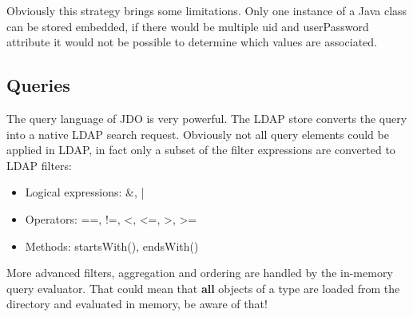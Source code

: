 \documentclass[a4paper,11pt,oneside]{article}
\begin{document}
\begin{figure}[htb]
\end{figure}
Obviously this strategy brings some limitations. Only one instance of a Java class can be stored embedded, if there would be multiple uid and userPassword attribute it would not be possible to determine which values are associated. 


\subsection{Queries}
The query language of JDO is very powerful. The LDAP store converts the query into a native LDAP search request. Obviously not all query elements could be applied in LDAP, in fact only a subset of the filter expressions are converted to LDAP filters:
\begin{itemize}
\item Logical expressions: \&, |
\item Operators: ==, !=, <, <=, >, >=
\item Methods: startsWith(), endsWith()
\end{itemize}
More advanced filters, aggregation and ordering are handled by the in-memory query evaluator. That could mean that \textbf{all} objects of a type are loaded from the directory and evaluated in memory, be aware of that!
\end{document}

